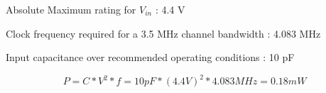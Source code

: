 \documentclass[10pt]{article}
\begin{document}
  Absolute Maximum rating for $V_{in}$ : 4.4 V
  
  Clock frequency required for a 3.5 MHz channel bandwidth : 4.083 MHz
  
  Input capacitance over recommended operating conditions : 10 pF
  \begin{center}
  \begin{equation}
  P = C * V^2 * f = 10 pF * (4.4 V)^2 * 4.083 MHz = 0.18 mW
  \end{equation}
  \end{center}
  
\end{document}
